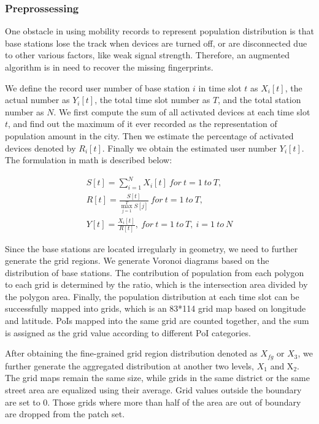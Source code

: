 \documentclass[letterpaper]{article} %
\begin{document}
\subsubsection{Preprossessing}

One obstacle in using mobility records to represent population distribution is that base stations lose the track when devices are turned off, or are disconnected due to other various factors, like weak signal strength. Therefore, an augmented algorithm is in need to recover the missing fingerprints. 

We define the record user number of base station $i$ in time slot $t$ as $X_{i}[t]$, the actual number as $Y_{i}[t]$, the total time slot number as $T$, and the total station number as $N$. We first compute the sum of all activated devices at each time slot $t$, and find out the maximum of it ever recorded as the representation of population amount in the city. Then we estimate the percentage of activated devices denoted by $R_{i}[t]$. Finally we obtain the estimated user number $Y_{i}[t]$. The formulation in math is described below:

\begin{gather}
S[t] = \sum\limits_{i=1}^{N}X_{i}[t]\: for\: t = 1\:to\: T,\\
R[t] = \frac{S[t]}{\max_{j=1}^{T}S[j]}\: for\: t = 1 \:to \:T,\\
Y[t] = \frac{X_{i}[t]}{R[t]},\: for\: t = 1\:to \:T, \:i = 1\: to\: N
\end{gather}

Since the base stations are located irregularly in geometry, we need to further generate the grid regions. We generate Voronoi diagrams based on the distribution of base stations. The contribution of population from each polygon to each grid is determined by the ratio, which is the intersection area divided by the polygon area. Finally, the population distribution at each time slot can be successfully mapped into grids, which is an 83*114 grid map based on longitude and latitude. PoIs mapped into the same grid are counted together, and the sum is assigned as the grid value according to different PoI categories.

After obtaining the fine-grained grid region distribution denoted as $X_{fg}$ or $X_3$, we further generate the aggregated distribution at another two levels, $X_{1}$ and X$_{2}$. The grid maps remain the same size, while grids in the same district or the same street area are equalized using their average. Grid values outside the boundary are set to 0. Those grids where more than half of the area are out of boundary are dropped from the patch set.
\end{document}

